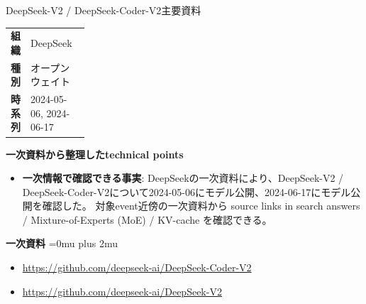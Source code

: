 \Needspace{0.38\textheight}
\begin{technicalnote}{DeepSeek-V2 / DeepSeek-Coder-V2}{主要資料}
\begingroup
\begin{tabularx}{\linewidth}{@{}>{\bfseries}p{0.22\linewidth}X@{}}
組織 & DeepSeek \\
種別 & オープンウェイト \\
時系列 & 2024-05-06, 2024-06-17 \\
\end{tabularx}
\smallskip
\begin{minipage}{\linewidth}
{\bfseries 一次資料から整理したtechnical points}
\begin{itemize}[leftmargin=1.5em,itemsep=0.35em]
\item \textbf{一次情報で確認できる事実}: DeepSeekの一次資料により、DeepSeek-V2 / DeepSeek-Coder-V2について2024-05-06にモデル公開、2024-06-17にモデル公開を確認した。 対象event近傍の一次資料から source links in search answers / Mixture-of-Experts (MoE) / KV-cache を確認できる。
\end{itemize}
\begin{minipage}{\linewidth}
\begin{samepage}
{\bfseries 一次資料}
\begingroup\sloppy
\Urlmuskip=0mu plus 2mu\relax
\begin{itemize}[leftmargin=1.5em,itemsep=0.25em]
\item {\scriptsize\url{https://github.com/deepseek-ai/DeepSeek-Coder-V2}}
\item {\scriptsize\url{https://github.com/deepseek-ai/DeepSeek-V2}}
\end{itemize}
\endgroup
\end{samepage}
\end{minipage}
\end{minipage}
\endgroup
\end{technicalnote}
\medskip


